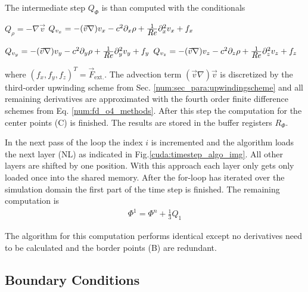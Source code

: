 The intermediate step $Q_{\Phi}$ is than computed with the conditionals
\begin{center}
 \begin{minipage}{.55\linewidth}
\begin{algorithmic}
      \STATE ${Q_{\rho} = -\nabla \vec{v}}$
\ENDIF
{}
      \STATE ${Q_{v_x} = -(\vec{v} \nabla) v_x - c^2\partial_x\rho + \frac{1}{\mbox{\textit{Re}}}\partial^2_xv_x + f_x}$
\ENDIF
\end{algorithmic}
 \end{minipage}

\clearpage

 \begin{minipage}{.55\linewidth}
\begin{algorithmic}
      \STATE ${Q_{v_y} = -(\vec{v} \nabla) v_y - c^2\partial_y\rho + \frac{1}{\mbox{\textit{Re}}}\partial^2_yv_y + f_y}$
\ENDIF
{}
      \STATE ${Q_{v_z} = -(\vec{v} \nabla) v_z - c^2\partial_z\rho + \frac{1}{\mbox{\textit{Re}}}\partial^2_zv_z + f_z}$
\ENDIF
\end{algorithmic}
 \end{minipage}
\end{center}

where $(f_x, f_y, f_z)^T = \vec{F}_{\text{ext.}}$. The advection term $(\vec{v}\nabla)\vec{v}$ is discretized by the third-order upwinding scheme from Sec. \ref{num:sec_para:upwindingscheme}
and all remaining derivatives are approximated with the fourth order finite difference schemes from Eq. \ref{num:fd_o4_methods}.
After this step the computation for the center points (C) is finished.
The results are stored in the buffer registers $R_\Phi$.

In the next pass of the loop the index $i$ is incremented and the algorithm loads the next layer (NL) as indicated in Fig.\ref{cuda:timestep_algo_img}.
All other layers are shifted by one position. With this approach each layer only gets only loaded once into the shared memory.
After the for-loop has iterated over the simulation domain the first part of the time step is finished.
The remaining computation is
\begin{align}
     \Phi^{1} = \Phi^n + \frac{1}{3}Q_1
\end{align}

The algorithm for this computation performs identical except no derivatives need to be calculated and
the border points (B) are redundant.

\subsection{Boundary Conditions}
\label{sec:cuda_boundaries}

